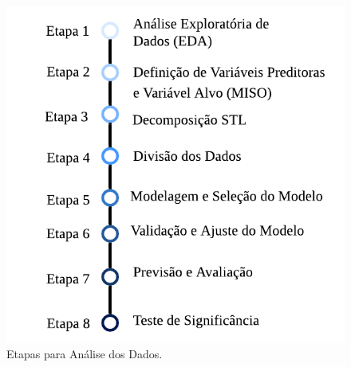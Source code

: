 \begin{figure}[!htb]
	\centering
	\caption{Etapas para Análise dos Dados.}
	\label{fig:etapas}
	\includegraphics[width=0.7\linewidth]{Introducao/Figuras/Etapas.pdf}
\end{figure}

